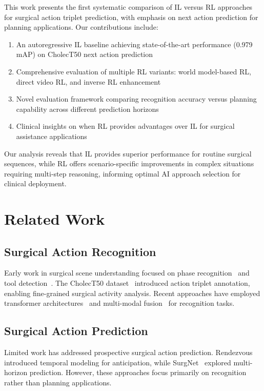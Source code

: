 \documentclass[runningheads]{llncs}
\begin{document}
This work presents the first systematic comparison of IL versus RL approaches for surgical action triplet prediction, with emphasis on next action prediction for planning applications. Our contributions include:

\begin{enumerate}
\item An autoregressive IL baseline achieving state-of-the-art performance (0.979 mAP) on CholecT50 next action prediction
\item Comprehensive evaluation of multiple RL variants: world model-based RL, direct video RL, and inverse RL enhancement
\item Novel evaluation framework comparing recognition accuracy versus planning capability across different prediction horizons  
\item Clinical insights on when RL provides advantages over IL for surgical assistance applications
\end{enumerate}

Our analysis reveals that IL provides superior performance for routine surgical sequences, while RL offers scenario-specific improvements in complex situations requiring multi-step reasoning, informing optimal AI approach selection for clinical deployment.

\section{Related Work}

\subsection{Surgical Action Recognition}
Early work in surgical scene understanding focused on phase recognition~\cite{ref_phases} and tool detection~\cite{ref_tools}. The CholecT50 dataset~\cite{ref_cholect50} introduced action triplet annotation, enabling fine-grained surgical activity analysis. Recent approaches have employed transformer architectures~\cite{ref_transformers} and multi-modal fusion~\cite{ref_multimodal} for recognition tasks.

\subsection{Surgical Action Prediction}
Limited work has addressed prospective surgical action prediction. Rendezvous~\cite{ref_rendezvous} introduced temporal modeling for anticipation, while SurgNet~\cite{ref_surgnet} explored multi-horizon prediction. However, these approaches focus primarily on recognition rather than planning applications.
\end{document}

